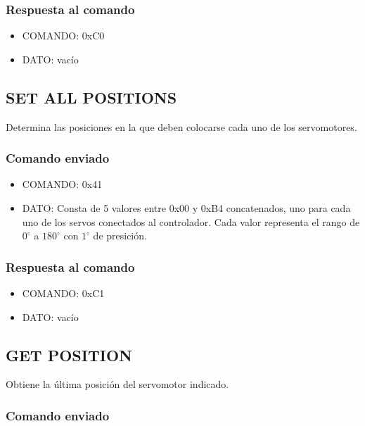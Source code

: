 \documentclass[a4paper,10pt]{article}
\begin{document}
\subsubsection*{Respuesta al comando}

\begin{itemize}
	\item{COMANDO:} 0xC0
	\item{DATO:} vac\'io
\end{itemize}

\subsection{SET ALL POSITIONS}
\label{set_all_positions}

Determina las posiciones en la que deben colocarse cada uno de los servomotores.

\subsubsection*{Comando enviado}

\begin{itemize}
	\item{COMANDO:} 0x41
	\item{DATO:} Consta de 5 valores entre 0x00 y 0xB4 concatenados, uno para cada uno de los servos conectados al controlador.
	Cada valor representa el rango de $0^{\circ}$ a $180^{\circ}$ con $1^{\circ}$ de presici\'on.
\end{itemize}

\subsubsection*{Respuesta al comando}

\begin{itemize}
	\item{COMANDO:} 0xC1
	\item{DATO:} vac\'io
\end{itemize}

\subsection{GET POSITION}
\label{get_position}

Obtiene la \'ultima posici\'on del servomotor indicado.

\subsubsection*{Comando enviado}
\end{document}
